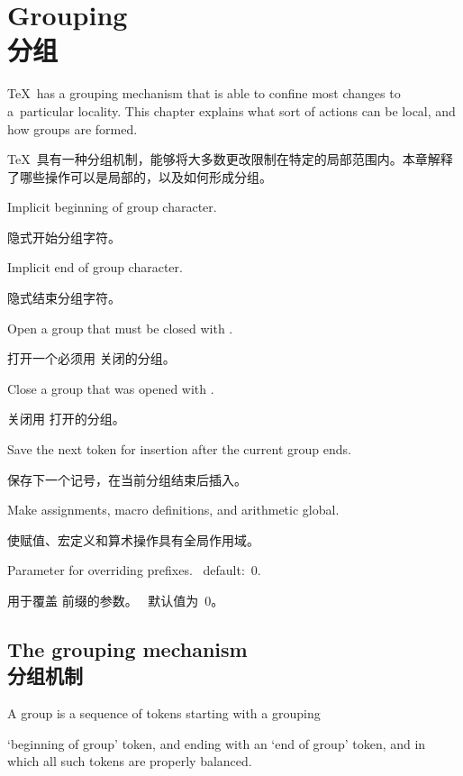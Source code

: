 
\endofchapter
\chapter{Grouping\\分组}\label{group}

\TeX\ has a grouping mechanism that is able to confine most
changes to a~particular locality. This chapter explains
what sort of actions can be local, and how groups are formed.

\TeX\ 具有一种分组机制，能够将大多数更改限制在特定的局部范围内。本章解释了哪些操作可以是局部的，以及如何形成分组。
\begin{inventory}
\item [\cs{bgroup}] 
Implicit beginning of group character.

隐式开始分组字符。
\item [\cs{egroup}] 
Implicit end of group character.

隐式结束分组字符。
\item [\cs{begingroup}] 
Open a group that must be closed with .

打开一个必须用  关闭的分组。
\item [\cs{endgroup}] 
Close a group that was opened with .

关闭用  打开的分组。
\item [\cs{aftergroup}] 
Save the next token for insertion after the current group ends.

保存下一个记号，在当前分组结束后插入。
\item [\cs{global}] 
Make assignments, macro definitions, and arithmetic global.

使赋值、宏定义和算术操作具有全局作用域。
\item [\cs{globaldefs}] 
Parameter for overriding  prefixes.
\IniTeX\ default:~0.

用于覆盖  前缀的参数。
\IniTeX\ 默认值为~0。
\end{inventory}



\section{The grouping mechanism\\分组机制}

A group is a sequence of tokens starting with a
\term grouping\par
`beginning of group' token,
and ending with an `end of group'
token, and in which all such tokens are properly balanced. 

